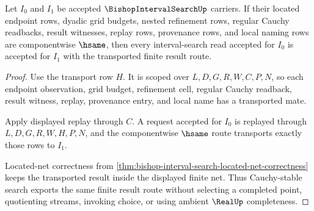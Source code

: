 \begin{theorem}
\label{thm:bishop-interval-search-cauchy-stability}
Let $I_0$ and $I_1$ be accepted $\BishopIntervalSearchUp$ carriers. If their located endpoint rows, dyadic grid budgets, nested refinement rows, regular Cauchy readbacks, result witnesses, replay rows, provenance rows, and local naming rows are componentwise $\hsame$, then every interval-search read accepted for $I_0$ is accepted for $I_1$ with the transported finite result route.
\end{theorem}
\begin{proof}
Use the transport row $H$. It is scoped over $L,D,G,R,W,C,P,N$, so each endpoint observation, grid budget, refinement cell, regular Cauchy readback, result witness, replay, provenance entry, and local name has a transported mate.

Apply displayed replay through $C$. A request accepted for $I_0$ is replayed through $L,D,G,R,W,H,P,N$, and the componentwise $\hsame$ route transports exactly those rows to $I_1$.

Located-net correctness from \autoref{thm:bishop-interval-search-located-net-correctness} keeps the transported result inside the displayed finite net. Thus Cauchy-stable search exports the same finite result route without selecting a completed point, quotienting streams, invoking choice, or using ambient $\RealUp$ completeness.
\end{proof}




